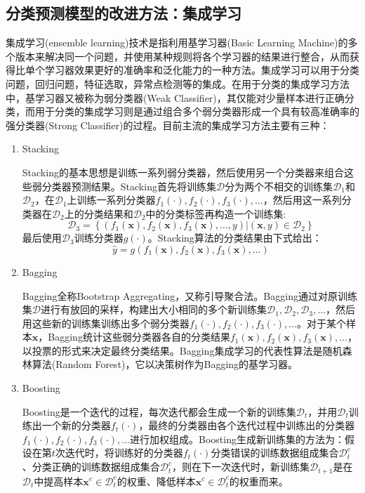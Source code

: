 \documentclass[a4paper]{ctexart}
\begin{document}
\subsection{分类预测模型的改进方法：集成学习}
集成学习(ensemble learning)技术是指利用基学习器(Basic Learning Machine)的多个版本来解决同一个问题，并使用某种规则将各个学习器的结果进行整合，从而获得比单个学习器效果更好的准确率和泛化能力的一种方法。集成学习可以用于分类问题，回归问题，特征选取，异常点检测等的集成。在用于分类的集成学习方法中，基学习器又被称为弱分类器(Weak Classifier)，其仅能对少量样本进行正确分类，而用于分类的集成学习则是通过组合多个弱分类器形成一个具有较高准确率的强分类器(Strong Classifier)的过程。目前主流的集成学习方法主要有三种\cite{RN90}\cite{RN197}：

\begin{enumerate}
	\item Stacking

	      Stacking的基本思想是训练一系列弱分类器，然后使用另一个分类器来组合这些弱分类器预测结果。Stacking首先将训练集$\mathcal D$分为两个不相交的训练集$\mathcal D_1$和$\mathcal D_2$，在$\mathcal D_1$上训练一系列分类器$f_1(\cdot),f_2(\cdot),f_3(\cdot),\dots$，然后用这一系列分类器在$\mathcal D_2$上的分类结果和$\mathcal D_2$中的分类标签再构造一个训练集:
	      $$\mathcal D_3=\left\{\left(f_1(\bm x),f_2(\bm x),f_3(\bm x),\dots,y\right)|(\bm x,y)\in\mathcal D_2\right\}$$
	      最后使用$\mathcal D_3$训练分类器$g(\cdot)$。Stacking算法的分类结果由下式给出：
	      $$\hat y=g(f_1(\bm x),f_2(\bm x),f_3(\bm x),\dots)$$

	\item Bagging

	      Bagging全称Bootstrap Aggregating，又称引导聚合法。Bagging通过对原训练集$\mathcal D$进行有放回的采样，构建出大小相同的多个新训练集$\mathcal D_1,\mathcal D_2,\mathcal D_3,\dots$，然后用这些新的训练集训练出多个弱分类器$f_1(\cdot),f_2(\cdot),f_3(\cdot),\dots$。对于某个样本$\bm x$，Bagging统计这些弱分类器各自的分类结果$f_1(\bm x),f_2(\bm x),f_3(\bm x),\dots$，以投票的形式来决定最终分类结果。Bagging集成学习的代表性算法是随机森林算法(Random Forest)，它以决策树作为Bagging的基学习器。

	\item Boosting

	      Boosting是一个迭代的过程，每次迭代都会生成一个新的训练集$\mathcal D_t$，并用$\mathcal D_t$训练出一个新的分类器$f_t(\cdot)$，最终的分类器由各个迭代过程中训练出的分类器$f_1(\cdot),f_2(\cdot),f_3(\cdot),\dots$进行加权组成。Boosting生成新训练集的方法为：假设在第$t$次迭代时，将训练好的分类器$f_t(\cdot)$分类错误的训练数据组成集合$\mathcal D_t^{e}$、分类正确的训练数据组成集合$\mathcal D_t^{c}$，则在下一次迭代时，新训练集$\mathcal D_{t+1}$是在$\mathcal D_t$中提高样本$\bm x^e\in \mathcal D_t^{e}$的权重、降低样本$\bm x^c\in \mathcal D_t^{c}$的权重而来。

\end{enumerate}
\end{document}
